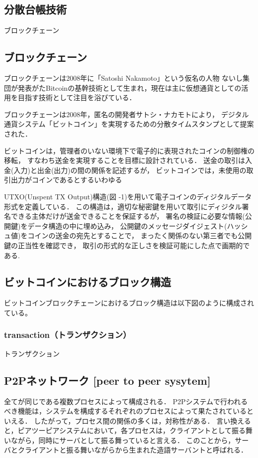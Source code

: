 \documentclass[a4paper,12pt]{jsarticle}
\begin{document}
      \subsection{分散台帳技術}
ブロックチェーン

      \subsection{ブロックチェーン}

ブロックチェーンは2008年に「Satoshi Nakamoto」という仮名の人物
ないし集団が発表がたBitcoinの基幹技術として生まれ，現在は主に仮想通貨としての活用を目指す技術として注目を浴びている．

ブロックチェーンは2008年，匿名の開発者サトシ・ナカモトにより，
デジタル通貨システム「ビットコイン」を実現するための分散タイムスタンプとして提案された．

ビットコインは，管理者のいない環境下で電子的に表現されたコインの制御権の移転，
すなわち送金を実現することを目標に設計されている．
送金の取引は入金(入力)と出金(出力)の間の関係を記述するが，
ビットコインでは，未使用の取引出力がコインであるとするいわゆる

UTXO(Unspent TX Output)構造(図 -1)を用いて電子コインのディジタルデータ形式を定義している．
この構造は，適切な秘密鍵を用いて取引にディジタル署名できる主体だけが送金できることを保証するが，
署名の検証に必要な情報(公開鍵)をデータ構造の中に埋め込み，
公開鍵のメッセージダイジェスト(ハッシュ値)をコインの送金の宛先とすることで，
まったく関係のない第三者でも公開鍵の正当性を確認でき，
取引の形式的な正しさを検証可能にした点で画期的である.

      \subsection{ビットコインにおけるブロック構造}
ビットコインブロックチェーンにおけるブロック構造は以下図のように構成されている。


            \subsubsection{transaction（トランザクション）}
トランザクション


      \subsection{P2Pネットワーク [peer to peer sysytem]}
全てが同じである複数プロセスによって構成される．
P2Pシステムで行われるべき機能は，システムを構成するそれぞれのプロセスによって果たされているといえる．
したがって，プロセス間の関係の多くは，対称性がある．
言い換えると，ピアツーピアシステムにおいて，各プロセスは，クライアントとして振る舞いながら，同時にサーバとして振る舞っていると言える．
このことから，サーバとクライアントと振る舞いながらから生まれた造語サーバントと呼ばれる．
\end{document}
